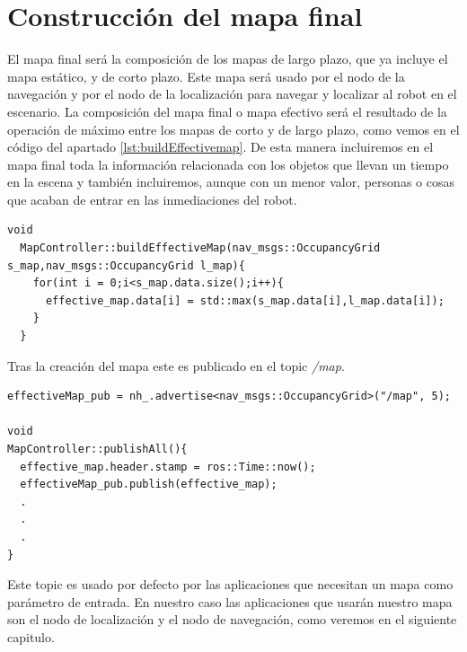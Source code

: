 \section{Construcción del mapa final}
\label{sec:construccionmap}
El mapa final será la composición de los mapas de largo plazo, que ya incluye el mapa estático, y de corto plazo. Este mapa será usado por el nodo de la navegación y por el nodo de la localización para navegar y localizar al robot en el escenario. La composición del mapa final o mapa efectivo será el resultado de la operación de máximo entre los mapas de corto y de largo plazo, como vemos en el código del apartado \ref{lst:buildEffectivemap}. De esta manera incluiremos en el mapa final toda la información relacionada con los objetos que llevan un tiempo en la escena y también incluiremos, aunque con un menor valor, personas o cosas que acaban de entrar en las inmediaciones del robot.
\pagebreak

\begin{lstlisting}[caption=Composición del mapa final, label={lst:buildEffectivemap}]
  void
  MapController::buildEffectiveMap(nav_msgs::OccupancyGrid s_map,nav_msgs::OccupancyGrid l_map){
    for(int i = 0;i<s_map.data.size();i++){
      effective_map.data[i] = std::max(s_map.data[i],l_map.data[i]);
    }
  }
\end{lstlisting}

Tras la creación del mapa este es publicado en el topic \textit{/map}. 

\begin{lstlisting}[caption=Publicación del mapa final, label={lst:effectivemappublish}]
effectiveMap_pub = nh_.advertise<nav_msgs::OccupancyGrid>("/map", 5);

void
MapController::publishAll(){
  effective_map.header.stamp = ros::Time::now();
  effectiveMap_pub.publish(effective_map);
  .
  .
  .
}
\end{lstlisting}


Este topic es usado por defecto por las aplicaciones que necesitan un mapa como parámetro de entrada. En nuestro caso las aplicaciones que usarán nuestro mapa son el nodo de localización y el nodo de navegación, como veremos en el siguiente capitulo. 




